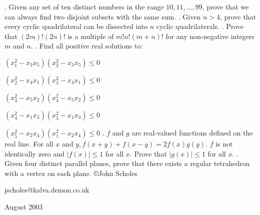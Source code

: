 \nopagenumbers
{}
\vskip 25pt
. Given any set of ten distinct numbers in the range $10,11,\ldots,99$, prove that we can always find two disjoint subsets with the same sum.
\vskip 12pt
. Given $n>4$, prove that every cyclic quadrilateral can be dissected into $n$ cyclic quadrilaterals.
\vskip 12pt
. Prove that $(2m)!(2n)!$ is a multiple of $m!n!(m+n)!$ for any non-negative integers $m$ and $n$.
\vskip 12pt
. Find all positive real solutions to:

$(x_1^2-x_3x_5)(x_2^2-x_3x_5)\le0$

$(x_2^2-x_4x_1)(x_3^2-x_4x_1)\le0$

$(x_3^2-x_5x_2)(x_4^2-x_5x_2)\le0$

$(x_4^2-x_1x_3)(x_5^2-x_1x_3)\le0$

$(x_5^2-x_2x_4)(x_1^2-x_2x_4)\le0$
\vskip 12pt
. $f$ and $g$ are real-valued functions defined on the real line. For all $x$ and $y, f(x+y)+f(x-y)=2f(x)g(y)$. $f$ is not identically zero and $|f(x)|\le1$ for all $x$. Prove that $|g(x)|\le1$ for all $x$.
\vskip 12pt
. Given four distinct parallel planes, prove that there exists a regular tetrahedron with a vertex on each plane.
\vskip 20pt
\noindent \copyright John Scholes

\noindent jscholes@kalva.demon.co.uk

 August 2003

\bye
